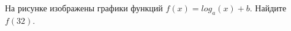 \begin{ex}
	\begin{condition}
		\begin{minipage}[t]{0.67\textwidth}
			На рисунке изображены графики функций \( f(x)=log_a(x)+b \). Найдите \( f(32) \).
		\end{minipage}
		\begin{minipage}[c]{0.25\textwidth}
		\end{minipage}
	\end{condition}
\end{ex}